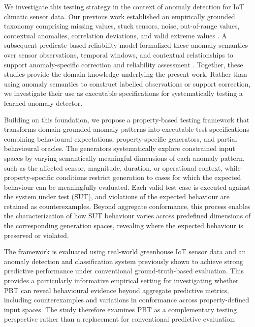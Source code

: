 \documentclass[preprint,12pt]{elsarticle}
\begin{document}
We investigate this testing strategy in the context of anomaly detection
for IoT climatic sensor data. Our previous work established an empirically
grounded taxonomy comprising missing values, stuck sensors, noise,
out-of-range values, contextual anomalies, correlation deviations, and
valid extreme values \cite{carrero2026ifac}. A subsequent predicate-based
reliability model formalized these anomaly semantics over sensor
observations, temporal windows, and contextual relationships to support
anomaly-specific correction and reliability assessment
\cite{carrero2026qrs}. Together, these studies provide the domain knowledge
underlying the present work. Rather than using anomaly semantics to construct
labelled observations or support correction, we investigate their use as
executable specifications for systematically testing a learned anomaly
detector.

Building on this foundation, we propose a property-based testing framework
that transforms domain-grounded anomaly patterns into executable test
specifications combining behavioural expectations, property-specific
generators, and partial behavioural oracles. The generators systematically
explore constrained input spaces by varying semantically meaningful
dimensions of each anomaly pattern, such as the affected sensor, magnitude,
duration, or operational context, while property-specific conditions restrict
generation to cases for which the expected behaviour can be meaningfully
evaluated. Each valid test case is executed against the system under test
(SUT), and violations of the expected behaviour are retained as
counterexamples. Beyond aggregate conformance, this process enables the
characterization of how SUT behaviour varies across predefined dimensions of
the corresponding generation spaces, revealing where the expected behaviour
is preserved or violated.

The framework is evaluated using real-world greenhouse IoT sensor data and
an anomaly detection and classification system previously shown to achieve
strong predictive performance under conventional ground-truth-based
evaluation. This provides a particularly informative empirical setting for
investigating whether PBT can reveal behavioural evidence beyond aggregate
predictive metrics, including counterexamples and variations in conformance
across property-defined input spaces. The study therefore examines PBT as a
complementary testing perspective rather than a replacement for conventional
predictive evaluation.
\end{document}
